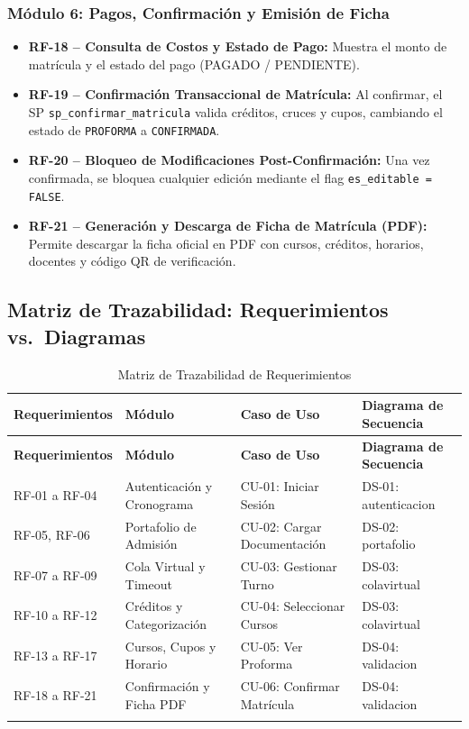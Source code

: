 \documentclass[12pt,a4paper]{article}
\begin{document}
\subsubsection{M\'odulo 6: Pagos, Confirmaci\'on y Emisi\'on de Ficha}

\begin{itemize}[leftmargin=*]
  \item \textbf{RF-18 -- Consulta de Costos y Estado de Pago:}
    Muestra el monto de matr\'icula y el estado del pago (PAGADO / PENDIENTE).

  \item \textbf{RF-19 -- Confirmaci\'on Transaccional de Matr\'icula:}
    Al confirmar, el SP \texttt{sp\_confirmar\_matricula} valida cr\'editos, cruces y cupos, cambiando el estado de \texttt{PROFORMA} a \texttt{CONFIRMADA}.

  \item \textbf{RF-20 -- Bloqueo de Modificaciones Post-Confirmaci\'on:}
    Una vez confirmada, se bloquea cualquier edici\'on mediante el flag \texttt{es\_editable = FALSE}.

  \item \textbf{RF-21 -- Generaci\'on y Descarga de Ficha de Matr\'icula (PDF):}
    Permite descargar la ficha oficial en PDF con cursos, cr\'editos, horarios, docentes y c\'odigo QR de verificaci\'on.
\end{itemize}

\subsection{Matriz de Trazabilidad: Requerimientos vs.\ Diagramas}

\begin{longtable}{>{\small}p{2.8cm}>{\small}p{3.5cm}>{\small}p{4cm}>{\small}p{3.5cm}}
  \toprule
  \textbf{Requerimientos} & \textbf{M\'odulo} & \textbf{Caso de Uso} & \textbf{Diagrama de Secuencia} \\
  \midrule
  \endfirsthead
  \midrule
  \textbf{Requerimientos} & \textbf{M\'odulo} & \textbf{Caso de Uso} & \textbf{Diagrama de Secuencia} \\
  \midrule
  \endhead
  RF-01 a RF-04 & Autenticaci\'on y Cronograma & CU-01: Iniciar Sesi\'on & DS-01: autenticacion \\
  \midrule
  RF-05, RF-06  & Portafolio de Admisi\'on     & CU-02: Cargar Documentaci\'on & DS-02: portafolio \\
  \midrule
  RF-07 a RF-09 & Cola Virtual y Timeout       & CU-03: Gestionar Turno & DS-03: colavirtual \\
  \midrule
  RF-10 a RF-12 & Cr\'editos y Categorizaci\'on & CU-04: Seleccionar Cursos & DS-03: colavirtual \\
  \midrule
  RF-13 a RF-17 & Cursos, Cupos y Horario      & CU-05: Ver Proforma & DS-04: validacion \\
  \midrule
  RF-18 a RF-21 & Confirmaci\'on y Ficha PDF   & CU-06: Confirmar Matr\'icula & DS-04: validacion \\
  \bottomrule
  \caption{Matriz de Trazabilidad de Requerimientos}
\end{longtable}
\end{document}
